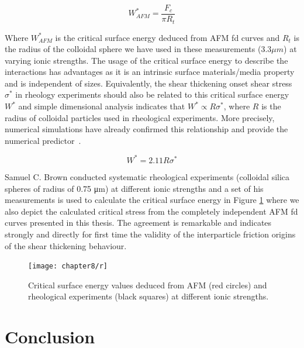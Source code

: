 \[ W^*_{AFM} = \frac{F_c}{\pi R_t} \]

Where $W^*_{AFM}$ is the critical surface energy deduced from AFM fd curves and $R_t$ is the radius of the colloidal sphere we have used in these measurements ($3.3 \mu m$) at varying ionic strengths. The usage of the critical surface energy to describe the interactions has advantages as it is an intrinsic surface materials/media property and is independent of sizes. Equivalently, the shear thickening onset shear stress $\sigma^*$ in rheology experiments should also be related to this critical surface energy $W^*$ and simple dimensional analysis indicates that $W^* \propto R\sigma^*$, where $R$ is the radius of colloidal particles used in rheological experiments. More precisely, numerical simulations have already confirmed this relationship and provide the numerical predictor~\cite{reference4}.

\[ W^* = 2.11 R\sigma^* \]

Samuel C. Brown conducted systematic rheological experiments (colloidal silica spheres of radius of 0.75 μm) at different ionic strengths and a set of his measurements is used to calculate the critical surface energy in Figure \ref{fig:critical_surface_energy} where we also depict the calculated critical stress from the completely independent AFM fd curves presented in this thesis. The agreement is remarkable and indicates strongly and directly for first time the validity of the interparticle friction origins of the shear thickening behaviour.

\begin{figure}[H]
\centering
\texttt{[image: chapter8/r]}
\caption{Critical surface energy values deduced from AFM (red circles) and rheological experiments (black squares) at different ionic strengths.}
\label{fig:critical_surface_energy}
\end{figure}

\newpage
\newpage

\chapter{Conclusion}

